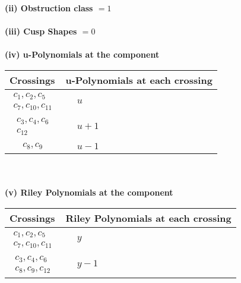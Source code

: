 \documentclass[1p]{elsarticle_modified}
\theoremstyle{definition}
\begin{document}
\flushleft \textbf{(ii) Obstruction class $= 1$}\\~\\
\flushleft \textbf{(iii) Cusp Shapes $= 0$}\\~\\
\newpage\renewcommand{\arraystretch}{1}
\flushleft \textbf{(iv) u-Polynomials at the component}\newline \\
\begin{tabular}{m{50pt}|m{274pt}}
Crossings & \hspace{64pt}u-Polynomials at each crossing \\
\hline $$\begin{aligned}c_{1},c_{2},c_{5}\\c_{7},c_{10},c_{11}\end{aligned}$$&$\begin{aligned}
&u
\end{aligned}$\\
\hline $$\begin{aligned}c_{3},c_{4},c_{6}\\c_{12}\end{aligned}$$&$\begin{aligned}
&u+1
\end{aligned}$\\
\hline $$\begin{aligned}c_{8},c_{9}\end{aligned}$$&$\begin{aligned}
&u-1
\end{aligned}$\\
\hline
\end{tabular}\\~\\
\newpage\renewcommand{\arraystretch}{1}
\flushleft \textbf{(v) Riley Polynomials at the component}\newline \\
\begin{tabular}{m{50pt}|m{274pt}}
Crossings & \hspace{64pt}Riley Polynomials at each crossing \\
\hline $$\begin{aligned}c_{1},c_{2},c_{5}\\c_{7},c_{10},c_{11}\end{aligned}$$&$\begin{aligned}
&y
\end{aligned}$\\
\hline $$\begin{aligned}c_{3},c_{4},c_{6}\\c_{8},c_{9},c_{12}\end{aligned}$$&$\begin{aligned}
&y-1
\end{aligned}$\\
\hline
\end{tabular}\\~\\
\end{document}
